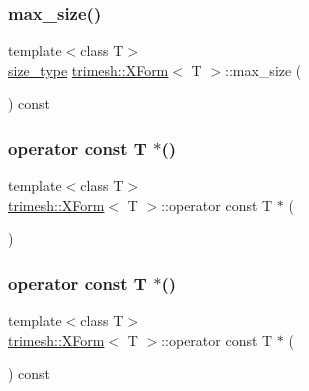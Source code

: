 \subsubsection{\texorpdfstring{max\+\_\+size()}{max\_size()}}
{\footnotesize\ttfamily template$<$class T$>$ \\
\hyperlink{classtrimesh_1_1XForm_aa219f141417c9026a74dec8b6279d4bf}{size\+\_\+type} \hyperlink{classtrimesh_1_1XForm}{trimesh\+::\+X\+Form}$<$ T $>$\+::max\+\_\+size (\begin{DoxyParamCaption}{ }\end{DoxyParamCaption}) const\hspace{0.3cm}{\ttfamily [inline]}}

\mbox{\label{classtrimesh_1_1XForm_a40f98910aba7ce8cead829ef89cfa20d}} 
\subsubsection{\texorpdfstring{operator const T $\ast$()}{operator const T *()}\hspace{0.1cm}{\footnotesize\ttfamily [1/2]}}
{\footnotesize\ttfamily template$<$class T$>$ \\
\hyperlink{classtrimesh_1_1XForm}{trimesh\+::\+X\+Form}$<$ T $>$\+::operator const T $\ast$ (\begin{DoxyParamCaption}{ }\end{DoxyParamCaption})\hspace{0.3cm}{\ttfamily [inline]}}

\mbox{\label{classtrimesh_1_1XForm_a720d0b7d15136abbf52411933f54fe3d}} 
\subsubsection{\texorpdfstring{operator const T $\ast$()}{operator const T *()}\hspace{0.1cm}{\footnotesize\ttfamily [2/2]}}
{\footnotesize\ttfamily template$<$class T$>$ \\
\hyperlink{classtrimesh_1_1XForm}{trimesh\+::\+X\+Form}$<$ T $>$\+::operator const T $\ast$ (\begin{DoxyParamCaption}{ }\end{DoxyParamCaption}) const\hspace{0.3cm}{\ttfamily [inline]}}

